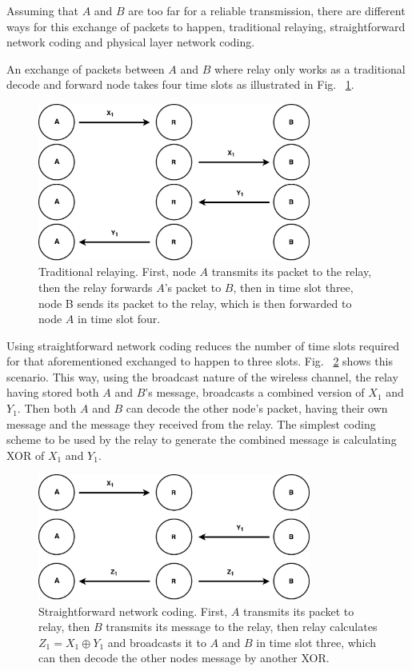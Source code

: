 Assuming that $A$ and $B$ are too far for a reliable transmission, there are different ways for this exchange of packets to happen, traditional relaying, straightforward network coding and physical layer network coding.

An exchange of packets between $A$ and $B$ where relay only works as a traditional decode and forward node takes four time slots as illustrated in Fig.~ \ref{fig:traditionalRelay}.  

\begin{figure} [th]
    \centering
    \includegraphics[width=0.8\textwidth]{figures/traditionalRelay.pdf}
    \caption{Traditional relaying. First, node $A$ transmits its packet to the relay, then the relay forwards $A$'s packet to $B$, then in time slot three, node B sends its packet to the relay, which is then forwarded to node $A$ in time slot four.} \label{fig:traditionalRelay}
\end{figure}

Using straightforward network coding reduces the number of time slots required for that aforementioned exchanged to happen to three slots. Fig.~ \ref{fig:straightforwardNC} shows this scenario. This way, using the broadcast nature of the wireless channel, the relay having stored both $A$ and $B$'s message, broadcasts a combined version of $X_1$ and $Y_1$. Then both $A$ and $B$ can decode the other node's packet, having their own message and the message they received from the relay. The simplest coding scheme to be used by the relay to generate the combined message is calculating XOR of  $X_1$ and $Y_1$.

\begin{figure} [th]
    \centering
    \includegraphics[width=0.8\textwidth]{figures/straightforwardNC.pdf}
    \caption{Straightforward network coding. First, $A$ transmits its packet to relay, then $B$ transmits its message to the relay, then relay calculates $Z_1=X_1 \oplus Y_1$ and broadcasts it to $A$ and $B$ in time slot three, which can then decode the other nodes message by another XOR.} \label{fig:straightforwardNC}
\end{figure}

